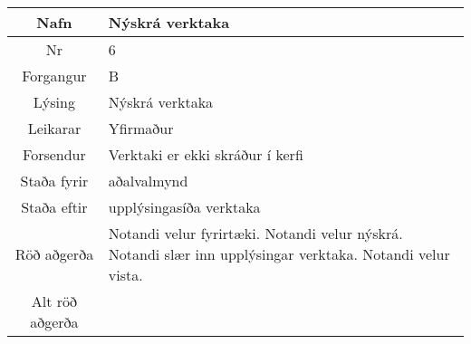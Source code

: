 \documentclass[a4paper]{article}
\begin{document}
\begin{tabular}{|c|p{10cm}|}
\hline
Nafn&Nýskrá verktaka \\
\hline
Nr&6\\
\hline
Forgangur&B\\
\hline
Lýsing&Nýskrá verktaka \\
\hline
Leikarar&Yfirmaður\\
\hline
Forsendur&Verktaki er ekki skráður í kerfi\\
\hline
Staða fyrir&aðalvalmynd\\
\hline
Staða eftir&upplýsingasíða verktaka\\
\hline
Röð aðgerða&Notandi velur fyrirtæki. Notandi velur nýskrá. Notandi slær inn upplýsingar verktaka. Notandi velur vista.\\
\hline
Alt röð aðgerða&\\
\hline
\end{tabular}
\end{document}
